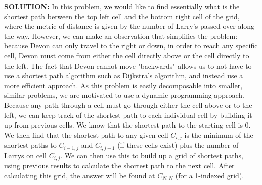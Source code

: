 \textbf{SOLUTION:}
\blank
In this problem, we would like to find essentially what is the shortest path between the top left cell and the bottom right cell of the grid, where the metric of distance is given by the number of Larry's passed over along the way.  However, we can make an observation that simplifies the problem: because Devon can only travel to the right or down, in order to reach any specific cell, Devon must come from either the cell directly above or the cell directly to the left.  The fact that Devon cannot move "backwards" allows us to not have to use a shortest path algorithm such as Dijkstra's algorithm, and instead use a more efficient approach.
\blank
As this problem is easily decomposable into smaller, similar problems, we are motivated to use a dynamic programming approach.  Because any path through a cell must go through either the cell above or to the left, we can keep track of the shortest path to each individual cell by building it up from previous cells.  We know that the shortest path to the starting cell is $0$.  We then find that the shortest path to any given cell $ C_{i,j}$ is the minimum of the shortest paths to $C_{i-1,j}$ and $C_{i,j-1}$ (if these cells exist) plus the number of Larrys on cell $C_{i,j}$.  We can then use this to build up a grid of shortest paths, using previous results to calculate the shortest path to the next cell.  After calculating this grid, the answer will be found at $C_{N,N}$ (for a 1-indexed grid).